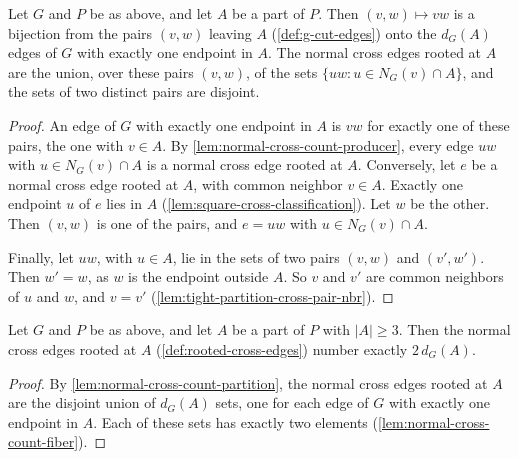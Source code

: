 \begin{lemma}
  \label{lem:normal-cross-count-partition}
  \leanok
  Let $G$ and $P$ be as above, and let $A$ be a part of $P$. Then
  $(v, w) \mapsto vw$ is a bijection from the pairs $(v, w)$ leaving $A$
  (\cref{def:g-cut-edges}) onto the $d_G(A)$ edges of $G$ with exactly
  one endpoint in $A$. The normal cross edges rooted at
  $A$ are the union, over these pairs $(v, w)$, of the sets
  $\{uw : u \in N_G(v) \cap A\}$, and the sets of two distinct pairs are
  disjoint.
\end{lemma}
\begin{proof}
  \leanok
  An edge of $G$ with exactly one endpoint in $A$ is $vw$ for exactly one
  of these pairs, the one with $v \in A$. By
  \cref{lem:normal-cross-count-producer}, every edge $uw$ with
  $u \in N_G(v) \cap A$ is a normal cross edge rooted at $A$. Conversely,
  let $e$ be a normal cross edge rooted at $A$, with common neighbor
  $v \in A$. Exactly one endpoint $u$ of $e$ lies in $A$
  (\cref{lem:square-cross-classification}). Let $w$ be the other. Then
  $(v, w)$ is one of the pairs, and $e = uw$ with $u \in N_G(v) \cap A$.

  Finally, let $uw$, with $u \in A$, lie in the sets of two pairs
  $(v, w)$ and $(v', w')$. Then $w' = w$, as $w$ is the endpoint outside
  $A$. So $v$ and $v'$ are common neighbors of $u$ and $w$, and $v = v'$
  (\cref{lem:tight-partition-cross-pair-nbr}).
\end{proof}

\begin{lemma}
  \label{lem:normal-cross-count}
  \leanok
  Let $G$ and $P$ be as above, and let $A$ be a part of $P$ with
  $|A| \ge 3$. Then the normal cross edges rooted at $A$
  (\cref{def:rooted-cross-edges}) number exactly $2\,d_G(A)$.
\end{lemma}
\begin{proof}
  \leanok
  By \cref{lem:normal-cross-count-partition}, the normal cross edges
  rooted at $A$ are the disjoint union of $d_G(A)$ sets, one for each
  edge of $G$ with exactly one endpoint in $A$. Each of these sets has
  exactly two elements (\cref{lem:normal-cross-count-fiber}).
\end{proof}

